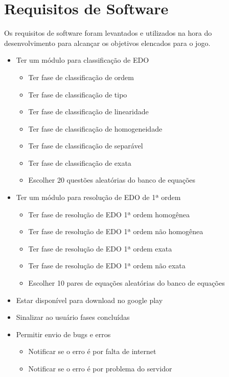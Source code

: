 \section[Requisitos de Software]{Requisitos de Software}
Os requisitos de software foram levantados e utilizados na hora do desenvolvimento para alcançar os objetivos elencados para o jogo. 

\begin{itemize}
	\item Ter um módulo para classificação de EDO
		\begin{itemize}
			\item Ter fase de classificação de ordem
			\item Ter fase de classificação de tipo
			\item Ter fase de classificação de linearidade
			\item Ter fase de classificação de homogeneidade
			\item Ter fase de classificação de separável
			\item Ter fase de classificação de exata
			\item Escolher 20 questões aleatórias do banco de equações
		\end{itemize}

	\item Ter um módulo para resolução de EDO de 1ª ordem
		\begin{itemize}
			\item Ter fase de resolução de EDO 1ª ordem homogênea
			\item Ter fase de resolução de EDO 1ª ordem não homogênea
			\item Ter fase de resolução de EDO 1ª ordem exata
			\item Ter fase de resolução de EDO 1ª ordem não exata
			\item Escolher 10 pares de equações aleatórias do banco de equações
		\end{itemize}

	\item Estar disponível para download no google play
	\item Sinalizar ao usuário fases concluídas
	\item Permitir envio de bugs e erros
		\begin{itemize}
			\item Notificar se o erro é por falta de internet
			\item Notificar se o erro é por problema do servidor
		\end{itemize}


\end{itemize}

